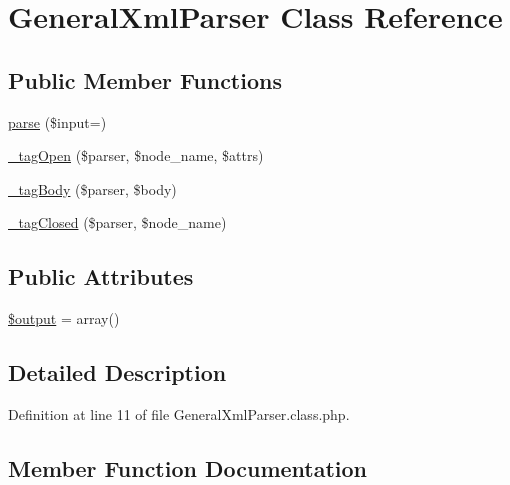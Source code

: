 \hypertarget{classGeneralXmlParser}{}\section{General\+Xml\+Parser Class Reference}
\label{classGeneralXmlParser}
\subsection*{Public Member Functions}
\begin{DoxyCompactItemize}
\item 
\hyperlink{classGeneralXmlParser_a68db7fa48bc66de2c48175422f59927d}{parse} (\$input=\textquotesingle{}\textquotesingle{})
\item 
\hyperlink{classGeneralXmlParser_a2921aab91afa276ce9f6c75cf483e80d}{\+\_\+tag\+Open} (\$parser, \$node\+\_\+name, \$attrs)
\item 
\hyperlink{classGeneralXmlParser_a78c57730ac9d216ba88c02eb2f3c2903}{\+\_\+tag\+Body} (\$parser, \$body)
\item 
\hyperlink{classGeneralXmlParser_a4609e66c695acd3f1a85450228f0b79b}{\+\_\+tag\+Closed} (\$parser, \$node\+\_\+name)
\end{DoxyCompactItemize}
\subsection*{Public Attributes}
\begin{DoxyCompactItemize}
\item 
\hyperlink{classGeneralXmlParser_a33ef1b950659188b06d8586c366f8fe2}{\$output} = array()
\end{DoxyCompactItemize}


\subsection{Detailed Description}


Definition at line 11 of file General\+Xml\+Parser.\+class.\+php.



\subsection{Member Function Documentation}
\mbox{\label{classGeneralXmlParser_a78c57730ac9d216ba88c02eb2f3c2903}} 
